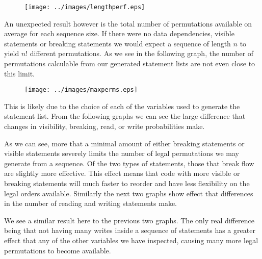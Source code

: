 \documentclass[twoside,a4paper]{report}
\begin{document}
\begin{figure}[h]
\centering
\scalebox{0.75}
{\texttt{[image: ../images/lengthperf.eps]}}
\end{figure}

An unexpected result however is the total number of permutations available on average for each sequence size. If there were no data dependencies, visible statements
or breaking statements we would expect a sequence of length $n$ to yield $n!$ different permutations. As we see in the following graph, the number of permutations
calculable from our generated statement lists are not even close to this limit.

\begin{figure}[h]
\centering
\scalebox{0.75}
{\texttt{[image: ../images/maxperms.eps]}}
\end{figure}

This is likely due to the choice of each of the variables used to generate the statement list. From the following graphs we can see the large
difference that changes in visibility, breaking, read, or write probabilities make.

\begin{figure}[h]
\centering
{}
\end{figure}

As we can see, more that a minimal amount of either breaking statements or visible statements severely limits the number of legal permutations we may
generate from a sequence. Of the two types of statements, those that break flow are slightly more effective. This effect means that code with more
visible or breaking statements will much faster to reorder and have less flexibility on the legal orders available. Similarly the next two graphs show
effect that differences in the number of reading and writing statements make.

\begin{figure}[h]
\centering
{}
\end{figure}

We see a similar result here to the previous two graphs. The only real difference being that not having many writes inside a sequence of statements
has a greater effect that any of the other variables we have inspected, causing many more legal permutations to become available.
\end{document}
